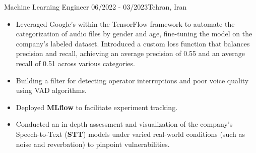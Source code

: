 \resumeSubheadingReza
{Machine Learning Engineer}{}
{06/2022 - 03/2023}{Tehran, Iran}
{
  \vspace{-12pt}
  \begin{itemize}
    \item {Leveraged Google's  within the TensorFlow framework to automate the categorization of audio files by gender and age, fine-tuning the model on the company's labeled dataset. Introduced a custom loss function that balances precision and recall, achieving an average precision of 0.55 and an average recall of 0.51 across various categories.}
    \item {Building a filter for detecting operator interruptions and poor voice quality using VAD algorithms.}
    \item {Deployed \textbf{MLflow} to facilitate experiment tracking.}
    \item {Conducted an in-depth assessment and visualization of the company's Speech-to-Text (\textbf{STT}) models under varied real-world conditions (such as noise and reverbation) to pinpoint vulnerabilities.}
  \end{itemize}
}
